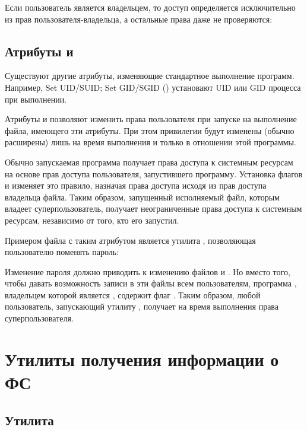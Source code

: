 Если пользователь является владельцем, то доступ определяется исключительно из прав пользователя-владельца, а остальные права даже не проверяются:


\subsection{Атрибуты  и }

Существуют другие атрибуты, изменяющие стандартное выполнение программ. Например, Set UID/SUID; Set GID/SGID () установают UID или GID процесса при выполнении.

Атрибуты  и  позволяют изменить права пользователя при запуске на выполнение файла, имеющего эти атрибуты. При этом привилегии будут изменены (обычно расширены) лишь на время выполнения и только в отношении этой программы.

Обычно запускаемая программа получает права доступа к системным ресурсам на основе прав доступа пользователя, запустившего программу. Установка флагов  и  изменяет это правило, назначая права доступа исходя из прав доступа владельца файла. Таким образом, запущенный исполняемый файл, которым владеет суперпользователь, получает неограниченные права доступа к системным ресурсам, независимо от того, кто его запустил.

Примером файла с таким атрибутом является утилита , позволяющая пользователю поменять пароль:


Изменение пароля должно приводить к изменению файлов  и . Но вместо того, чтобы давать возможность записи в эти файлы всем пользователям, программа , владельцем которой является , содержит флаг . Таким образом, любой пользователь, запускающий утилиту , получает на время выполнения права суперпользователя.


\section{Утилиты получения информации о ФС}

\subsection{Утилита }

